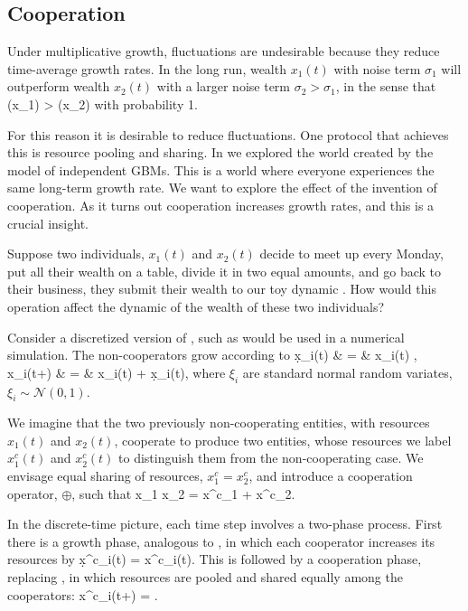 
\subsection{Cooperation}
Under multiplicative growth, fluctuations are undesirable because they reduce 
time-average growth rates. In the long run, wealth $x_1(t)$ with noise term 
$\sigma_1$ will outperform wealth $x_2(t)$ with a larger 
noise term $\sigma_2>\sigma_1$, in the sense that 
\be
\gt(x_1) > \gt(x_2)
\ee
with probability 1.

For this reason it is desirable to reduce fluctuations. One protocol that achieves this is 
resource pooling and sharing. In  we explored the world created 
by the model of independent GBMs. This is a world where everyone experiences the 
same long-term growth rate. We want to explore the effect of the invention of 
cooperation. As it turns out cooperation increases growth rates, and this is a 
crucial insight. 

Suppose two individuals, $x_1(t)$ and $x_2(t)$ decide to meet up every Monday, put all 
their wealth on a table, divide it in two equal amounts, and go back to their business, \ie
they submit their wealth to our toy dynamic . How 
would this operation affect the dynamic of the wealth of these two individuals?

 Consider a discretized version of , such as would be used in a numerical simulation. The non-cooperators grow according to
 \bea
 \d x_i(t) & = & x_i(t) ,  \\
 x_i(t+\dt) & = & x_i(t) + \d x_i(t), 
 \eea
 where $\xi_i$ are standard normal random variates, $\xi_i\sim \mathcal{N}(0,1)$.

We imagine that the two previously non-cooperating entities, with resources $x_1(t)$ and $x_2(t)$, cooperate to produce two entities, whose resources we label $x^c_1(t)$ and $x^c_2(t)$ to distinguish them from the non-cooperating case. We envisage equal sharing of resources, $x^c_1=x^c_2$, and introduce a cooperation operator, $\oplus$, such that
 \be
 x_1 \oplus x_2 = x^c_1 + x^c_2.
 \ee
 
 In the discrete-time picture, each time step involves a two-phase process. First there is a growth phase, analogous to , in which each cooperator increases its resources by
 \be
 \d x^c_i(t) = x^c_i(t).
 \ee
 This is followed by a cooperation phase, replacing , in which resources are pooled and shared equally among the cooperators:
 \be
 x^c_i(t+\dt) = .
 \ee
 
